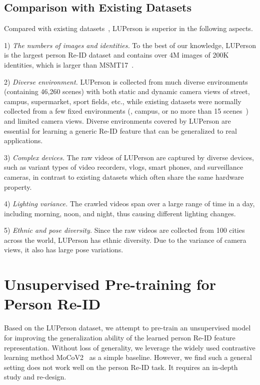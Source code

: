 \documentclass[final]{cvpr}
\begin{document}
\subsection{Comparison with Existing Datasets}
Compared with existing datasets~\cite{gray2008viewpoint,loy2013person,li2014deepreid,Zheng2015ScalablePR,karanam2016comprehensive,zheng2017unlabeled,wei2018person}, LUPerson is superior in the following aspects.

1) \textit{The numbers of images and identities.} To the best of our knowledge, LUPerson is the largest person Re-ID dataset and contains over 4M images of 200K identities, which is  larger than MSMT17~\cite{wei2018person}.

2) \textit{Diverse environment.} LUPerson is collected from much diverse environments (containing 46,260 scenes) with both static and dynamic camera views of street, campus, supermarket, sport fields, etc., while existing datasets were normally collected from a few fixed environments (\eg, campus, or no more than 15 scenes~\cite{wei2018person}) and limited camera views. Diverse environments covered by LUPerson are essential for learning a generic Re-ID feature that can be generalized to real applications.

3) \textit{Complex devices.} The raw videos of LUPerson are captured by diverse devices, such as variant types of video recorders, vlogs, smart phones, and surveillance cameras, in contrast to existing datasets which often share the same hardware property.

4) \textit{Lighting variance.} The crawled videos span over a large range of time in a day, including morning, noon, and night, thus causing different lighting changes.

5) \textit{Ethnic and pose diversity.} Since the raw videos are collected from 100 cities across the world, LUPerson has ethnic diversity. Due to the variance of camera views, it also has large pose variations.

\section{Unsupervised Pre-training for Person Re-ID}
\label{sec:ucl}

Based on the LUPerson dataset, we attempt to pre-train an unsupervised model for improving the generalization ability of the learned person Re-ID feature representation. Without loss of generality, we leverage the widely used contrastive learning method MoCoV2~\cite{chen2020improved} as a simple baseline. However, we find such a general setting does not work well on the person Re-ID task. It requires an in-depth study and re-design. 
\end{document}
